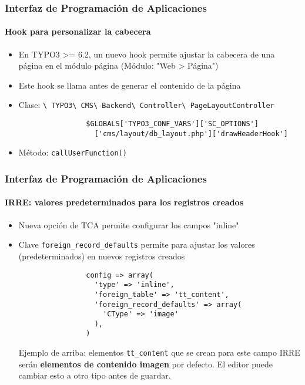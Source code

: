 \begin{frame}[fragile]
	\frametitle{Interfaz de Programación de Aplicaciones}
	\framesubtitle{Hook para personalizar la cabecera}

	\begin{itemize}
		\item En TYPO3 >= 6.2, un nuevo hook permite ajustar la cabecera de una página en el módulo página (Módulo: "Web > Página")
		\item Este hook se llama antes de generar el contenido de la página
		\item Clase:\newline
			\smaller
				\texttt{\textbackslash
					TYPO3\textbackslash
					CMS\textbackslash
					Backend\textbackslash
					Controller\textbackslash
					PageLayoutController}\normalsize

			\lstset{
				basicstyle=\smaller\ttfamily
			}

			\begin{lstlisting}
				$GLOBALS['TYPO3_CONF_VARS']['SC_OPTIONS']
				  ['cms/layout/db_layout.php']['drawHeaderHook']
			\end{lstlisting}

		\item Método:\newline
			\smaller
				\texttt{callUserFunction()}

	\end{itemize}

\end{frame}


\begin{frame}[fragile]
	\frametitle{Interfaz de Programación de Aplicaciones}
	\framesubtitle{IRRE: valores predeterminados para los registros creados}

	\begin{itemize}
		\item Nueva opción de TCA permite configurar los campos "inline"
		\item Clave \texttt{foreign\_record\_defaults} permite para ajustar los valores (predeterminados) en nuevos registros creados

			\begin{lstlisting}
				config => array(
				  'type' => 'inline',
				  'foreign_table' => 'tt_content',
				  'foreign_record_defaults' => array(
				    'CType' => 'image'
				  ),
				)
			\end{lstlisting}

			\small
				Ejemplo de arriba: elementos \texttt{tt\_content} que se crean para este campo IRRE serán \textbf{elementos de contenido imagen} por defecto. El editor puede cambiar esto a otro tipo antes de guardar.
			\normalsize

	\end{itemize}

\end{frame}

